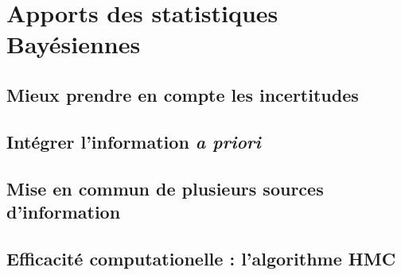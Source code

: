 \section{Apports des statistiques Bayésiennes}

\subsection{Mieux prendre en compte les incertitudes}

\subsection{Intégrer l'information {\em a priori}}

\subsection{Mise en commun de plusieurs sources d'information}

\subsection{Efficacité computationelle : l'algorithme HMC}